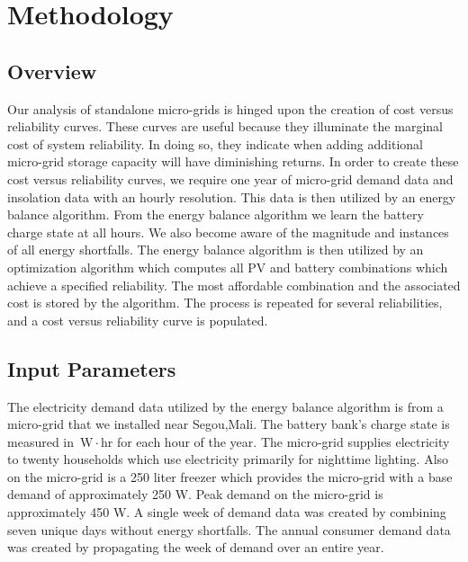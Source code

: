\documentclass{article}
\newcommand{\unit}[1]{\ensuremath{\, \mathrm{#1}}}
\begin{document}
\section{Methodology}
\subsection{Overview}

Our analysis of standalone micro-grids is hinged upon the creation of cost versus reliability curves.
These curves are useful because they illuminate the marginal cost of system reliability. 
In doing so, they indicate when adding additional micro-grid storage capacity will have diminishing returns.
In order to create these cost versus reliability curves, we require one year of micro-grid demand data and insolation data with an hourly resolution.
This data is then utilized by an energy balance algorithm.
From the energy balance algorithm we learn the battery charge state at all hours. 
We also become aware of the magnitude and instances of all energy shortfalls. 
The energy balance algorithm is then utilized by an optimization algorithm which computes all PV and battery combinations which achieve a specified reliability. 
The most affordable combination and the associated cost is stored by the algorithm. 
The process is repeated for several reliabilities, and a cost versus reliability curve is populated. 

\subsection{Input Parameters}
%
The electricity demand data utilized by the energy balance algorithm is from a micro-grid that we installed near Segou,Mali. 
The battery bank's charge state is measured in {\unit{W\!\cdot \! hr}} for each hour of the year.
The micro-grid supplies electricity to twenty households which use electricity primarily for nighttime lighting.
Also on the micro-grid is a 250 liter freezer which provides the micro-grid with a base demand of approximately 250 W. 
Peak demand on the micro-grid is approximately 450 W. 
A single week of demand data was created by combining seven unique days without energy shortfalls. 
The annual consumer demand data was created by propagating the week of demand over an entire year.
\end{document}
